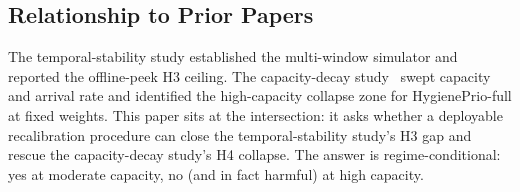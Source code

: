 \subsection{Relationship to Prior Papers}

The temporal-stability study established the multi-window simulator
and reported the offline-peek H3 ceiling. The capacity-decay study~\cite{paper6capacity}
swept capacity and arrival rate and identified the high-capacity
collapse zone for HygienePrio-full at fixed weights. This paper sits
at the intersection: it asks whether a deployable recalibration
procedure can close the temporal-stability study's H3 gap and rescue the capacity-decay study's H4 collapse.
The answer is regime-conditional: yes at moderate capacity, no (and
in fact harmful) at high capacity.
